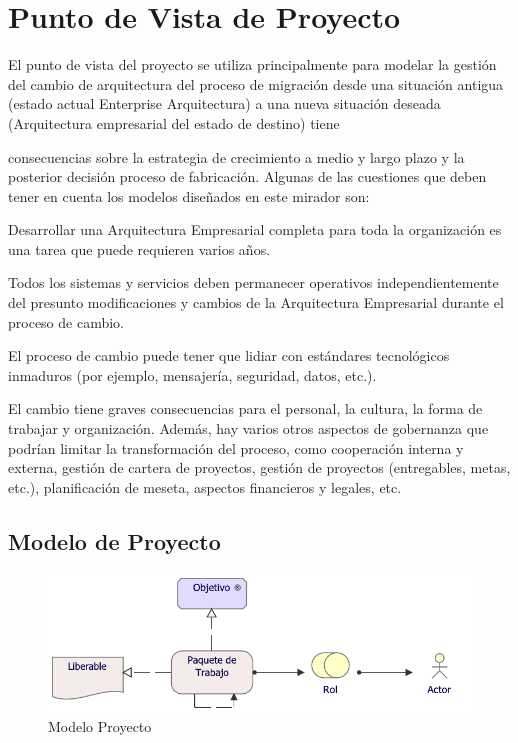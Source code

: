 \section{Punto de Vista de Proyecto}

El punto de vista del proyecto se utiliza principalmente para modelar la gestión del cambio de arquitectura del proceso de migración desde una situación antigua (estado actual Enterprise
Arquitectura) a una nueva situación deseada (Arquitectura empresarial del estado de destino) tiene

consecuencias sobre la estrategia de crecimiento a medio y largo plazo y la posterior decisión
proceso de fabricación.  Algunas de las cuestiones que deben tener en cuenta los modelos diseñados en
este mirador son:

Desarrollar una Arquitectura Empresarial completa para toda la organización es una tarea que puede
requieren varios años.

Todos los sistemas y servicios deben permanecer operativos independientemente del presunto modificaciones y cambios de la Arquitectura Empresarial durante el proceso de cambio.

El proceso de cambio puede tener que lidiar con estándares tecnológicos inmaduros (por ejemplo,
mensajería, seguridad, datos, etc.).

El cambio tiene graves consecuencias para el personal, la cultura, la forma de trabajar y
organización. Además, hay varios otros aspectos de gobernanza que podrían limitar la transformación del proceso, como cooperación interna y externa, gestión de cartera de proyectos, gestión de proyectos (entregables, metas, etc.), planificación de meseta, aspectos financieros y legales, etc.

\subsection{Modelo de Proyecto}
\begin{figure}[h!]
	\centering
	\includegraphics[width=.9\linewidth]{imgs/modelo/Proyecto}
	\caption{Modelo Proyecto}
\end{figure}

